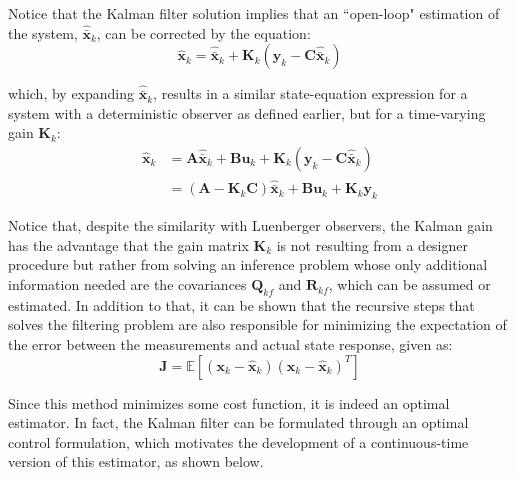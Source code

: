 \documentclass[a4paper,11pt]{book}
\numberwithin{figure}{chapter}
\numberwithin{equation}{chapter}
\numberwithin{table}{chapter}
\theoremstyle{definition}
\begin{document}
Notice that the Kalman filter solution implies that an ``open-loop" estimation of the system, $\hat{\bar{\bm{x}}}_k$, can be corrected by the equation:
\begin{equation}
	\hat{\bm{x}}_k =\hat{\bar{\bm{x}}}_k + \bm{K}_k (\bm{y}_k - \bm{C} \hat{\bar{\bm{x}}}_k)
\end{equation}

\noindent which, by expanding $\hat{\bar{\bm{x}}}_k$, results in a similar state-equation expression for a system with a deterministic observer as defined earlier, but for a time-varying gain $\bm{K}_k$:
\begin{equation}
\begin{split}
	\hat{\bm{x}}_k &= \bm{A} \hat{\bar{\bm{x}}}_k + \bm{B} \bm{u}_k + \bm{K}_k (\bm{y}_k - \bm{C} \hat{\bar{\bm{x}}}_k) \\
	&= \left( \bm{A} - \bm{K}_k \bm{C} \right) \hat{\bar{\bm{x}}}_k + \bm{B} \bm{u}_k + \bm{K}_k \bm{y}_k
\end{split}
\end{equation}

Notice that, despite the similarity with Luenberger observers, the Kalman gain has the advantage that the gain matrix $\bm{K}_k$ is not resulting from a designer procedure but rather from solving an inference problem whose only additional information needed are the covariances $\bm{Q}_{kf}$ and $\bm{R}_{kf}$, which can be assumed or estimated. In addition to that, it can be shown that the recursive steps that solves the filtering problem are also responsible for minimizing the expectation of the error between the measurements and actual state response, given as:
\begin{equation}
	\bm{J} = \mathbb{E}\left[ (\bm{x}_k - \hat{\bm{x}}_k)(\bm{x}_k - \hat{\bm{x}}_k)^T \right]
\end{equation}

Since this method minimizes some cost function, it is indeed an optimal estimator. In fact, the Kalman filter can be formulated through an optimal control formulation, which motivates the development of a continuous-time version of this estimator, as shown below.
\end{document}
